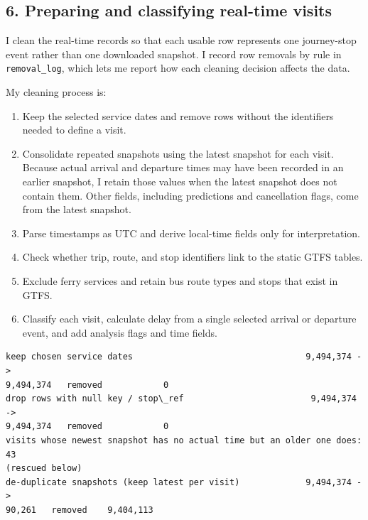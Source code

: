 \documentclass[11pt]{article}
\providecommand{\tightlist}{%
      \setlength{\itemsep}{0pt}\setlength{\parskip}{0pt}}
\begin{document}
    
    \subsection{6. Preparing and classifying real-time
visits}\label{preparing-and-classifying-real-time-visits}

I clean the real-time records so that each usable row represents one
journey-stop event rather than one downloaded snapshot. I record row
removals by rule in \texttt{removal\_log}, which lets me report how each
cleaning decision affects the data.

My cleaning process is:

\begin{enumerate}
\def\labelenumi{\arabic{enumi}.}
\tightlist
\item
  Keep the selected service dates and remove rows without the
  identifiers needed to define a visit.
\item
  Consolidate repeated snapshots using the latest snapshot for each
  visit. Because actual arrival and departure times may have been
  recorded in an earlier snapshot, I retain those values when the latest
  snapshot does not contain them. Other fields, including predictions
  and cancellation flags, come from the latest snapshot.
\item
  Parse timestamps as UTC and derive local-time fields only for
  interpretation.
\item
  Check whether trip, route, and stop identifiers link to the static
  GTFS tables.
\item
  Exclude ferry services and retain bus route types and stops that exist
  in GTFS.
\item
  Classify each visit, calculate delay from a single selected arrival or
  departure event, and add analysis flags and time fields.
\end{enumerate}

    \begin{Verbatim}[commandchars=\\\{\}]
keep chosen service dates                                  9,494,374 ->
9,494,374   removed            0
drop rows with null key / stop\_ref                         9,494,374 ->
9,494,374   removed            0
visits whose newest snapshot has no actual time but an older one does: 43
(rescued below)
de-duplicate snapshots (keep latest per visit)             9,494,374 ->
90,261   removed    9,404,113
    \end{Verbatim}
\end{document}
